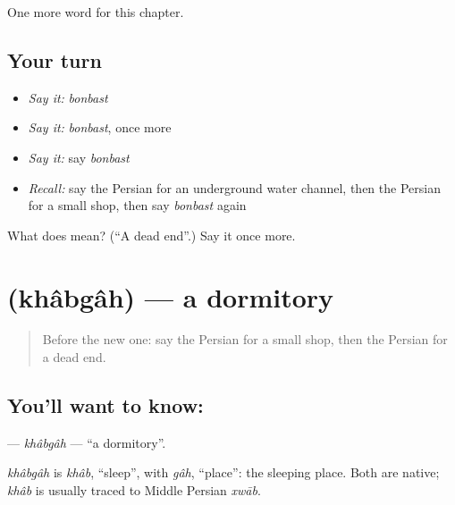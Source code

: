\begin{grammarlens}[title={What you've built}]
One more word for this chapter.
\end{grammarlens}

\subsection*{Your turn}
\begin{itemize}
\raggedright
  \item \emph{Say it:} \emph{bonbast}
  \item \emph{Say it:} \emph{bonbast}, once more
  \item \emph{Say it:} say \emph{bonbast}
  \item \emph{Recall:} say the Persian for an underground water channel, then the Persian for a small shop, then say \emph{bonbast} again
\end{itemize}

\begin{tcolorbox}[breakable,colback=teal!4,colframe=teal!35!black,title={Before you move on}]
What does  mean? (\textquotedblleft{}A dead end\textquotedblright{}.) Say it once more.
\end{tcolorbox}
\section[\texorpdfstring{\fa{خوابگاه} (khâbgâh)}{خوابگاه (khâbgâh)}]{ (khâbgâh) — a dormitory}

\label{lesson:FA-C157-khabgah}



\begin{quote}
Before the new one: say the Persian for a small shop, then the Persian for a dead end.
\end{quote}

\subsection*{You'll want to know: }
\textbf{} — \emph{khâbgâh} — \textquotedblleft{}a dormitory\textquotedblright{}.

\begin{cousinweb}
\emph{khâbgâh} is \emph{khâb}, \textquotedblleft{}sleep\textquotedblright{}, with \emph{gâh}, \textquotedblleft{}place\textquotedblright{}: the sleeping place. Both are native; \emph{khâb} is usually traced to Middle Persian \emph{xwāb}.
\end{cousinweb}

